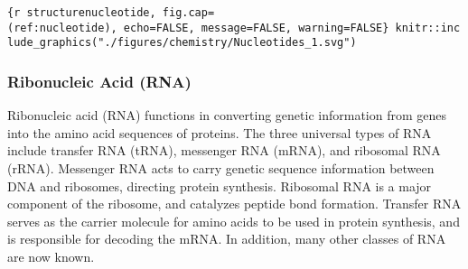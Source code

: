 \texttt{\{r\ structurenucleotide,\ fig.cap=\textquotesingle{}(ref:nucleotide)\textquotesingle{},\ echo=FALSE,\ message=FALSE,\ warning=FALSE\}\ knitr::include\_graphics("./figures/chemistry/Nucleotides\_1.svg")}

\hypertarget{ribonucleic-acid-rna}{%
\subsubsection{Ribonucleic Acid (RNA)}\label{ribonucleic-acid-rna}}

Ribonucleic acid (RNA) functions in converting genetic information from
genes into the amino acid sequences of proteins. The three universal
types of RNA include transfer RNA (tRNA), messenger RNA (mRNA), and
ribosomal RNA (rRNA). Messenger RNA acts to carry genetic sequence
information between DNA and ribosomes, directing protein synthesis.
Ribosomal RNA is a major component of the ribosome, and catalyzes
peptide bond formation. Transfer RNA serves as the carrier molecule for
amino acids to be used in protein synthesis, and is responsible for
decoding the mRNA. In addition, many other classes of RNA are now known.
